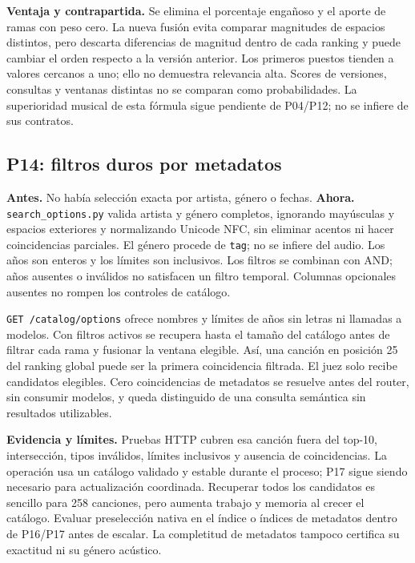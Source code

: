 \textbf{Ventaja y contrapartida.} Se elimina el porcentaje engañoso y el aporte
de ramas con peso cero. La nueva fusión evita comparar magnitudes de espacios
distintos, pero descarta diferencias de magnitud dentro de cada ranking y puede
cambiar el orden respecto a la versión anterior. Los primeros puestos tienden
a valores cercanos a uno; ello no demuestra relevancia alta. Scores de versiones,
consultas y ventanas distintas no se comparan como probabilidades. La superioridad
musical de esta fórmula sigue pendiente de P04/P12; no se infiere de sus contratos.

\subsection{P14: filtros duros por metadatos}
\textbf{Antes.} No había selección exacta por artista, género o fechas.
\textbf{Ahora.} \texttt{search\_options.py} valida artista y género completos,
ignorando mayúsculas y espacios exteriores y normalizando Unicode NFC, sin
eliminar acentos ni hacer coincidencias parciales. El género procede de
\texttt{tag}; no se infiere del audio. Los años son enteros y los límites son
inclusivos. Los filtros se combinan con AND; años ausentes o inválidos no
satisfacen un filtro temporal. Columnas opcionales ausentes no rompen los
controles de catálogo.

\texttt{GET /catalog/options} ofrece nombres y límites de años sin letras ni
llamadas a modelos. Con filtros activos se recupera hasta el tamaño del catálogo
antes de filtrar cada rama y fusionar la ventana elegible. Así, una canción en
posición 25 del ranking global puede ser la primera coincidencia filtrada.
El juez solo recibe candidatos elegibles. Cero coincidencias de metadatos se
resuelve antes del router, sin consumir modelos, y queda distinguido de una
consulta semántica sin resultados utilizables.

\textbf{Evidencia y límites.} Pruebas HTTP cubren esa canción fuera del top-10,
intersección, tipos inválidos, límites inclusivos y ausencia de coincidencias.
La operación usa un catálogo validado y estable durante el proceso; P17 sigue
siendo necesario para actualización coordinada. Recuperar todos los candidatos
es sencillo para 258 canciones, pero aumenta trabajo y memoria al crecer el
catálogo. Evaluar preselección nativa en el índice o índices de metadatos dentro
de P16/P17 antes de escalar. La completitud de metadatos tampoco certifica su
exactitud ni su género acústico.

